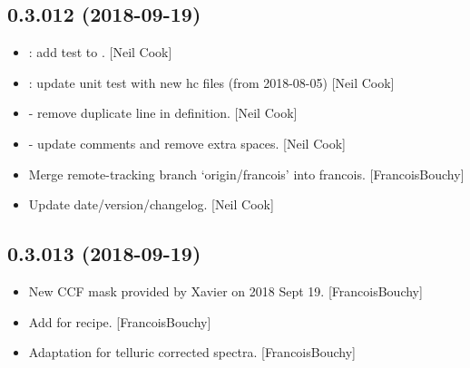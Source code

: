\documentclass[a4paper,10pt,english]{report}
\begin{document}
\subsection{0.3.012 (2018-09-19)}
\label{\detokenize{misc/changelog:id318}}\begin{itemize}
\item {} 
: add  test to . {[}Neil Cook{]}

\item {} 
: update unit test with new hc files (from 2018-08-05) {[}Neil
Cook{]}

\item {} 
 - remove duplicate line in  definition.
{[}Neil Cook{]}

\item {} 
 - update comments and remove extra spaces.
{[}Neil Cook{]}

\item {} 
Merge remote-tracking branch ‘origin/francois’ into francois.
{[}FrancoisBouchy{]}

\item {} 
Update date/version/changelog. {[}Neil Cook{]}

\end{itemize}


\subsection{0.3.013 (2018-09-19)}
\label{\detokenize{misc/changelog:id319}}\begin{itemize}
\item {} 
New CCF mask provided by Xavier on 2018 Sept 19. {[}FrancoisBouchy{]}

\item {} 
Add  for  recipe. {[}FrancoisBouchy{]}

\item {} 
Adaptation for telluric corrected spectra. {[}FrancoisBouchy{]}

\end{itemize}
\end{document}
